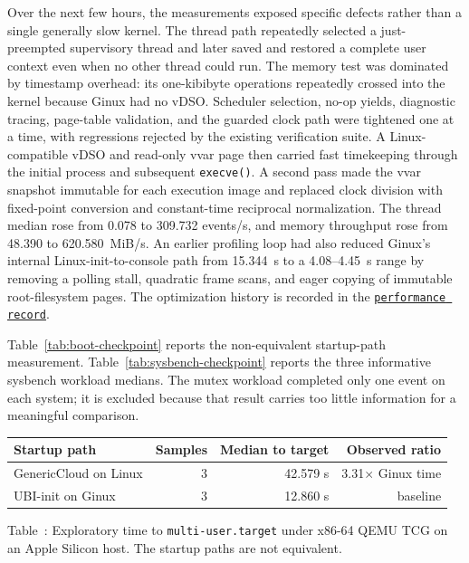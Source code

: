 \documentclass[11pt]{article}
\newcommand{\repolink}[2]{\href{https://github.com/gmkurtzer/ginux/blob/d11c126a048a51fe7eb9c4105f31760add1027ea/#1}{\texttt{#2}}}
\begin{document}
Over the next few hours, the measurements exposed specific defects rather
than a single generally slow kernel. The thread path repeatedly selected a
just-preempted supervisory thread and later saved and restored a complete user
context even when no other thread could run. The memory test was dominated by
timestamp overhead: its one-kibibyte operations repeatedly crossed into the
kernel because Ginux had no vDSO. Scheduler selection, no-op yields, diagnostic
tracing, page-table validation, and the guarded clock path were tightened one
at a time, with regressions rejected by the existing verification suite. A
Linux-compatible vDSO and read-only vvar page then carried fast timekeeping
through the initial process and subsequent \texttt{execve()}. A second pass
made the vvar snapshot immutable for each execution image and replaced clock
division with fixed-point conversion and constant-time reciprocal
normalization. The thread median rose from 0.078 to 309.732 events/s, and
memory throughput rose from 48.390 to 620.580~MiB/s. An earlier profiling loop had also reduced
Ginux's internal Linux-init-to-console path from 15.344~s to a 4.08--4.45~s
range by removing a polling stall, quadratic frame scans, and eager copying of
immutable root-filesystem pages. The optimization history is recorded in the
\repolink{docs/PERFORMANCE.md}{performance record}.

Table~\ref{tab:boot-checkpoint} reports the non-equivalent startup-path
measurement. Table~\ref{tab:sysbench-checkpoint} reports the three informative
sysbench workload medians. The mutex workload completed only one event on each
system; it is excluded because that result carries too little information for a
meaningful comparison.

\medskip
\begin{center}
\label{tab:boot-checkpoint}
\centering
\small
\begin{tabular}{@{}lrrr@{}}
\toprule
Startup path & Samples & Median to target & Observed ratio \\
\midrule
GenericCloud on Linux & 3 & 42.579 s & 3.31$\times$ Ginux time \\
UBI-init on Ginux & 3 & 12.860 s & baseline \\
\bottomrule
\end{tabular}
\par\medskip
Table~\thetable: Exploratory time to \texttt{multi-user.target} under x86-64
QEMU TCG on an Apple Silicon host. The startup paths are not equivalent.
\end{center}
\medskip
\end{document}
